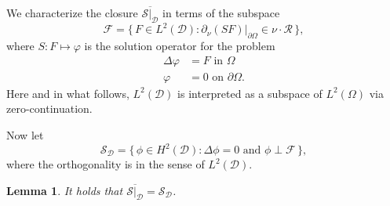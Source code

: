 \documentclass[reqno]{amsart}
\numberwithin{equation}{section}
\numberwithin{figure}{section}
\numberwithin{table}{section}
\newcommand{\D}{\mathcal{D}}
\theoremstyle{definition}
\theoremstyle{plain}
\newtheorem{lem}[thm]{Lemma}
\theoremstyle{definition}
\theoremstyle{remark}
\numberwithin{equation}{section}
\begin{document}
We characterize the closure $\overline{\mathcal{S}|_{\D}}$ in terms of the subspace
%
\begin{equation*} 
	\mathcal F = \{\, F \in L^2(\D) : \partial_\nu (S F)|_{\partial\Omega} \in  \nu \cdot \mathcal{R} \,\},
\end{equation*}
%
where $S \colon F \mapsto \varphi$ is the solution operator for the problem
%
\begin{equation} \label{eq_loc_source}
	\begin{split}
		\Delta \varphi &= F  \text{ in } \Omega \\
		\varphi &= 0  \text{ on } \partial\Omega.
	\end{split}
\end{equation}
%
Here and in what follows, $L^2(\D)$ is interpreted as a subspace of $L^2(\Omega)$ via zero-continuation. 

Now let
%
\begin{equation*} 
	\mathcal{S}_{\D} = \{\, \phi \in H^2(\D) : \Delta \phi = 0 \text{ and }  \phi \perp \mathcal F \,\},
\end{equation*} 
%
where the orthogonality is in the sense of $L^2(\D)$.

\begin{lem} \label{lem_S_D}
	It holds that $\overline{\mathcal{S}|_{\D}} = \mathcal{S}_{\D}$.
\end{lem}
\end{document}
